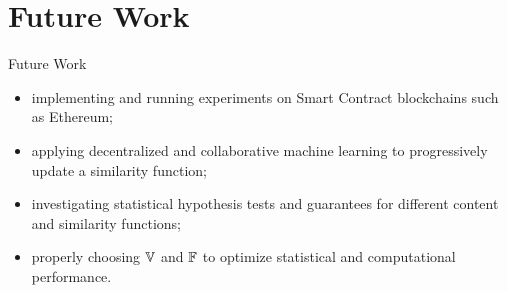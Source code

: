 \documentclass{beamer}
\begin{document}
\section{Future Work}
\begin{frame}{Future Work}
    \begin{itemize}
        \item implementing and running experiments on Smart Contract blockchains such as Ethereum;\pause
        \item applying decentralized and collaborative machine learning to progressively update a similarity function;\pause
        \item investigating statistical hypothesis tests and guarantees
        for different content and similarity functions;\pause
        \item properly choosing ${\mathbb{V}}$ and ${\mathbb{F}}$ to optimize statistical and computational performance.
    \end{itemize}
\end{frame}


\end{document}
